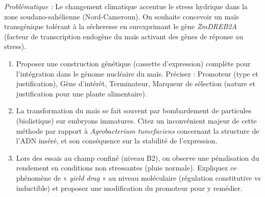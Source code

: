 \documentclass[11pt]{article}
\begin{document}
\begin{exercice}
\emph{Problématique :} Le changement climatique accentue le stress hydrique dans la zone soudano-sahélienne (Nord-Cameroun). On souhaite concevoir un maïs transgénique tolérant à la sécheresse en surexprimant le gène \textit{ZmDREB2A} (facteur de transcription endogène du maïs activant des gènes de réponse au stress).

\begin{enumerate}
    \item Proposez une construction génétique (cassette d'expression) complète pour l'intégration dans le génome nucléaire du maïs. Précisez : Promoteur (type et justification), Gène d'intérêt, Terminateur, Marqueur de sélection (nature et justification pour une plante alimentaire).
    \item La transformation du maïs se fait souvent par bombardement de particules (biolistique) sur embryons immatures. Citez un inconvénient majeur de cette méthode par rapport à \textit{Agrobacterium tumefaciens} concernant la structure de l'ADN inséré, et son conséquence sur la stabilité de l'expression.
    \item Lors des essais au champ confiné (niveau B2), on observe une pénalisation du rendement en conditions non stressantes (pluie normale). Expliquez ce phénomène de « \textit{yield drag} » au niveau moléculaire (régulation constitutive vs inductible) et proposez une modification du promoteur pour y remédier.
\end{enumerate}
\end{exercice}
\end{document}
